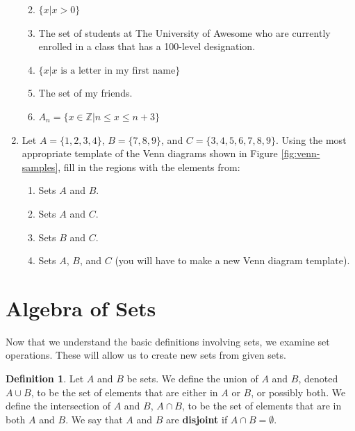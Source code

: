 \documentclass[
]{book}
\theoremstyle{definition}
\newtheorem{definition}{Definition}[chapter]
\theoremstyle{definition}
\theoremstyle{definition}
\theoremstyle{remark}
\begin{document}
\begin{enumerate}
  \begin{enumerate}
  \def\labelenumii{\alph{enumii})}
  \item
    \(\{x \vert x>0\}\)
  \item
    The set of students at The University of Awesome who are currently enrolled in a class that has a 100-level designation.
  \item
    \(\{x\vert x \textrm{ is a letter in my first name}\}\)
  \item
    The set of my friends.
  \item
    \(A_n=\{x\in \mathbb{Z} \vert n\leq x\leq n+3\}\)
  \end{enumerate}
\item
  Let \(A=\{1, 2, 3, 4\}\), \(B=\{7,8,9\}\), and \(C=\{3,4,5,6,7,8,9\}\). Using the most appropriate template of the Venn diagrams shown in Figure \ref{fig:venn-samples}, fill in the regions with the elements from:

  \begin{enumerate}
  \def\labelenumii{\alph{enumii})}
  \item
    Sets \(A\) and \(B\).
  \item
    Sets \(A\) and \(C\).
  \item
    Sets \(B\) and \(C\).
  \item
    Sets \(A\), \(B\), and \(C\) (you will have to make a new Venn diagram template).
  \end{enumerate}
\end{enumerate}

\hypertarget{algebra-of-sets}{%
\section{Algebra of Sets}\label{algebra-of-sets}}

Now that we understand the basic definitions involving sets, we examine set operations. These will allow us to create new sets from given sets.

\begin{definition}
\protect\hypertarget{def:unnamed-chunk-12}{}{\label{def:unnamed-chunk-12} }Let \(A\) and \(B\) be sets. We define the union of \(A\) and \(B\), denoted \(A \cup B\), to be the set of elements that are either in \(A\) or \(B\), or possibly both. We define the intersection of \(A\) and \(B\), \(A \cap B\), to be the set of elements that are in both \(A\) and \(B\). We say that \(A\) and \(B\) are \textbf{disjoint} if \(A\cap B = \emptyset\).
\end{definition}
\end{document}
